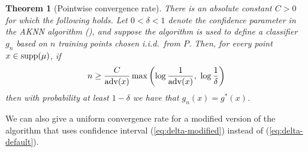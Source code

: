\documentclass{article}
\def\X{{\mathcal X}}
\def\supp{{\rm supp}}
\def\adv{{\rm adv}}
\newtheorem{theorem}{Theorem}
\newcommand{\comment}[3]{{\color{#1} {\bf #2 :} #3}}
\newcommand{\shay}[1]{\comment{purple}{Shay}{#1}}
\begin{document}

\begin{theorem}[Pointwise convergence rate]
There is an absolute constant $C > 0$ for which the following holds.
Let $0 < \delta < 1$ denote the confidence parameter in the AKNN algorithm (),
and suppose the algorithm is used to define a classifier $g_n$ based on $n$ training points chosen i.i.d.\ from $P$. 
Then, for every point $x\in\supp(\mu)$, if
\[n \geq \frac{C}{\adv(x)} \max \left( \log \frac{1}{\adv(x)}, \ \log \frac{1}{\delta} \right)\]
then with probability at least $1-\delta$ we have that $g_n(x)=g^*(x)$.
\label{thm:pointwise-rate}
\end{theorem}



We can also give a uniform convergence rate for a modified version of the algorithm that uses confidence interval (\ref{eq:delta-modified}) instead of (\ref{eq:delta-default}).

\end{document}
